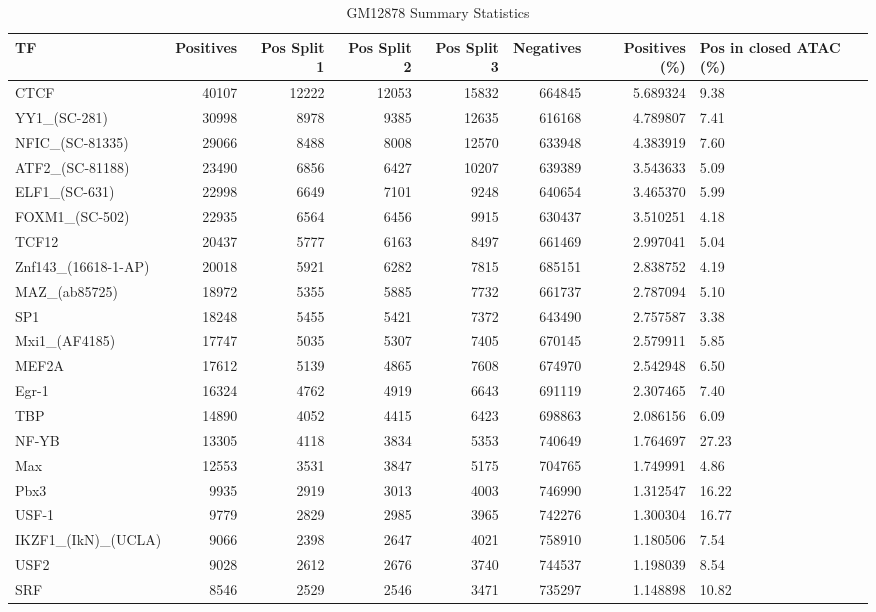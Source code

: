 \begin{table}
\caption{GM12878 Summary Statistics}
\label{tab:gm12878}
\begin{tabular}{lrrrrrrl}
\toprule
TF & Positives & Pos Split 1 & Pos Split 2 & Pos Split 3 & Negatives & Positives (\%) & Pos in closed ATAC (\%) \\
\midrule
CTCF & 40107 & 12222 & 12053 & 15832 & 664845 & 5.689324 & 9.38 \\
YY1\_(SC-281) & 30998 & 8978 & 9385 & 12635 & 616168 & 4.789807 & 7.41 \\
NFIC\_(SC-81335) & 29066 & 8488 & 8008 & 12570 & 633948 & 4.383919 & 7.60 \\
ATF2\_(SC-81188) & 23490 & 6856 & 6427 & 10207 & 639389 & 3.543633 & 5.09 \\
ELF1\_(SC-631) & 22998 & 6649 & 7101 & 9248 & 640654 & 3.465370 & 5.99 \\
FOXM1\_(SC-502) & 22935 & 6564 & 6456 & 9915 & 630437 & 3.510251 & 4.18 \\
TCF12 & 20437 & 5777 & 6163 & 8497 & 661469 & 2.997041 & 5.04 \\
Znf143\_(16618-1-AP) & 20018 & 5921 & 6282 & 7815 & 685151 & 2.838752 & 4.19 \\
MAZ\_(ab85725) & 18972 & 5355 & 5885 & 7732 & 661737 & 2.787094 & 5.10 \\
SP1 & 18248 & 5455 & 5421 & 7372 & 643490 & 2.757587 & 3.38 \\
Mxi1\_(AF4185) & 17747 & 5035 & 5307 & 7405 & 670145 & 2.579911 & 5.85 \\
MEF2A & 17612 & 5139 & 4865 & 7608 & 674970 & 2.542948 & 6.50 \\
Egr-1 & 16324 & 4762 & 4919 & 6643 & 691119 & 2.307465 & 7.40 \\
TBP & 14890 & 4052 & 4415 & 6423 & 698863 & 2.086156 & 6.09 \\
NF-YB & 13305 & 4118 & 3834 & 5353 & 740649 & 1.764697 & 27.23 \\
Max & 12553 & 3531 & 3847 & 5175 & 704765 & 1.749991 & 4.86 \\
Pbx3 & 9935 & 2919 & 3013 & 4003 & 746990 & 1.312547 & 16.22 \\
USF-1 & 9779 & 2829 & 2985 & 3965 & 742276 & 1.300304 & 16.77 \\
IKZF1\_(IkN)\_(UCLA) & 9066 & 2398 & 2647 & 4021 & 758910 & 1.180506 & 7.54 \\
USF2 & 9028 & 2612 & 2676 & 3740 & 744537 & 1.198039 & 8.54 \\
SRF & 8546 & 2529 & 2546 & 3471 & 735297 & 1.148898 & 10.82 \\

\end{tabular}
\end{table}
